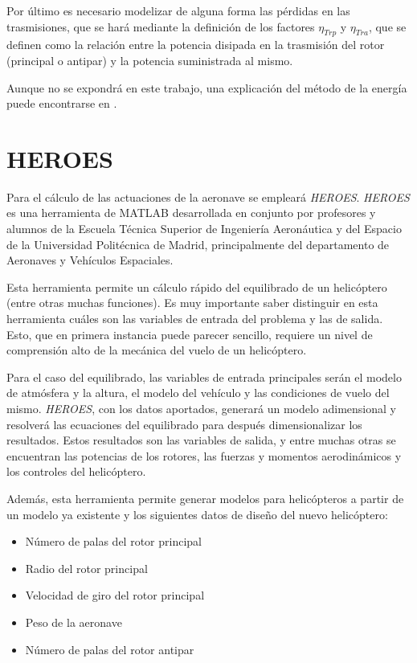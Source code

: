 Por último es necesario modelizar de alguna forma las pérdidas en las trasmisiones, que se hará mediante la definición de los factores $\eta_{Trp}$ y $\eta_{Tra}$, que se definen como la relación entre la potencia disipada en la trasmisión del rotor (principal o antipar) y la potencia suministrada al mismo.

Aunque no se expondrá en este trabajo, una explicación del método de la energía puede encontrarse en \citet{Cuerva}.

\section[\textbf{HE}licopter and \textbf{RO}tor \textbf{E}quilibrium and \textbf{S}tability toolbox]{HEROES}

Para el cálculo de las actuaciones de la aeronave se empleará \emph{HEROES}.
\emph{HEROES} es una herramienta de MATLAB desarrollada en conjunto por profesores y alumnos de la Escuela Técnica Superior de Ingeniería Aeronáutica y del Espacio de la Universidad Politécnica de Madrid, principalmente del departamento de Aeronaves y Vehículos Espaciales.

Esta herramienta permite un cálculo rápido del equilibrado de un helicóptero (entre otras muchas funciones). Es muy importante saber distinguir en esta herramienta cuáles son las variables de entrada del problema y las de salida. Esto, que en primera instancia puede parecer sencillo, requiere un nivel de comprensión alto de la mecánica del vuelo de un helicóptero.

Para el caso del equilibrado, las variables de entrada principales serán el modelo de atmósfera y la altura, el modelo del vehículo y las condiciones de vuelo del mismo. \emph{HEROES}, con los datos aportados, generará un modelo adimensional y resolverá las ecuaciones del equilibrado para después dimensionalizar los resultados. Estos resultados son las variables de salida, y entre muchas otras se encuentran las potencias de los rotores, las fuerzas y momentos aerodinámicos y los controles del helicóptero.

Además, esta herramienta permite generar modelos para helicópteros a partir de un modelo ya existente y los siguientes datos de diseño del nuevo helicóptero:

\begin{itemize}
	\item Número de palas del rotor principal
	\item Radio del rotor principal
	\item Velocidad de giro del rotor principal
	\item Peso de la aeronave
	\item Número de palas del rotor antipar
\end{itemize}

